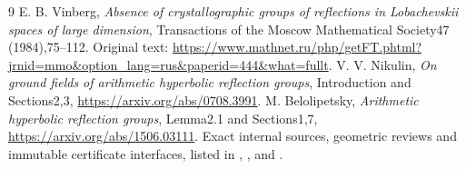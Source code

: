 \documentclass[11pt]{article}
\begin{document}
 {}
 {}

 {}
 {}

\begin{thebibliography}{9}
 E. B. Vinberg, \emph{Absence of crystallographic groups
of reflections in Lobachevskii spaces of large dimension}, Transactions
of the Moscow Mathematical Society47 (1984),75--112. Original text:
\url{https://www.mathnet.ru/php/getFT.phtml?jrnid=mmo&option_lang=rus&paperid=444&what=fullt}.
 V. V. Nikulin, \emph{On ground fields of arithmetic
hyperbolic reflection groups}, Introduction and Sections2,3,
\url{https://arxiv.org/abs/0708.3991}.
 M. Belolipetsky, \emph{Arithmetic hyperbolic
reflection groups}, Lemma2.1 and Sections1,7,
\url{https://arxiv.org/abs/1506.03111}.
 Exact internal sources, geometric reviews and immutable
certificate interfaces, listed in
,
,
and .
\end{thebibliography}
\end{document}
